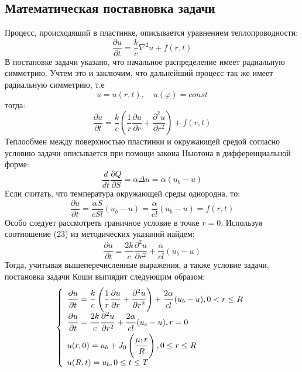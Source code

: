 \documentclass[a4paper,12pt,russian, fleqn]{extreport}
\begin{document}
	\subsection{Математическая поставновка задачи}
	Процесс, происходящий в пластинке, описывается уравнением теплопроводности:
	\begin{equation*}
	\dfrac{\partial u}{\partial t} = \dfrac{k}{c}\nabla^2u + f(r,t)
	\end{equation*}
	В постановке задачи указано, что начальное распределение имеет радиальную симметрию. Учтем это и заключим, что дальнейший процесс так же имеет радиальную симметрию, т.е 
	\begin{equation*}
	u = u(r,t), \quad u(\varphi) = const	
	\end{equation*}
	тогда:	
	\begin{equation*}
	\dfrac{\partial u}{\partial t} = \dfrac{k}{c} \left ( \dfrac{1}{r}\dfrac{\partial u}{\partial r} + \dfrac{\partial^2 u}{\partial r^2}\right ) + f(r,t)
	\end{equation*}
	Теплообмен между поверхностью пластинки и окружающей средой согласно условию задачи описывается при помощи закона Ньютона в дифференциальной форме:	
	\begin{equation*}
	\dfrac{d}{dt}\dfrac{\partial Q}{\partial S} = \alpha \Delta u  = \alpha (u_b - u)
	\end{equation*}
	Если считать, что температура окружающей среды однородна, то:	
	\begin{equation*}
	\dfrac{\partial u}{\partial t} = \dfrac{\alpha S}{cSl}(u_b - u) = \dfrac{\alpha}{cl}(u_b - u) = f(r,t)	
	\end{equation*}
	Особо следует рассмотреть граничное условие в точке $r = 0$. Используя соотношение (23) из методических указаний найдем:	
	\begin{equation*}
	\dfrac{\partial u}{\partial t} = \dfrac{2k}{c} \dfrac{\partial^2 u}{\partial r^2} + \dfrac{\alpha}{cl}(u_b - u)
	\end{equation*}
	Тогда, учитывая вышеперечисленные выражения, а также условие задачи, постановка задачи Коши выглядит следующим образом:	
	\begin{equation}\label{KoshiTask}
	\left \{
	\begin{array}{l}
	\dfrac{\strut \partial u}{\strut \partial t} = \dfrac{\strut k}{\strut c} \left ( \dfrac{\strut 1}{\strut r}\dfrac{\strut \partial u}{\strut \partial r} + \dfrac{\strut \partial^2 u}{\strut \partial r^2}\right ) + \dfrac{\strut 2\alpha}{\strut cl}(u_b - u), 0 < r \leq R\\
	\dfrac{\strut \partial u}{\strut \partial t} = \dfrac{\strut 2k}{\strut c} \dfrac{\strut \partial^2 u}{\strut \partial r^2} + \dfrac{\strut 2\alpha}{\strut cl}(u_c - u), r = 0 \\
	u(r, 0) = u_b + J_0\left(\dfrac{\strut \mu_1 r}{\strut R}\right), 0 \leq r \leq R \\
	u(R, t) = u_b, 0 \leq t \leq T
	\end{array}
	\right.
	\end{equation}
\end{document}
